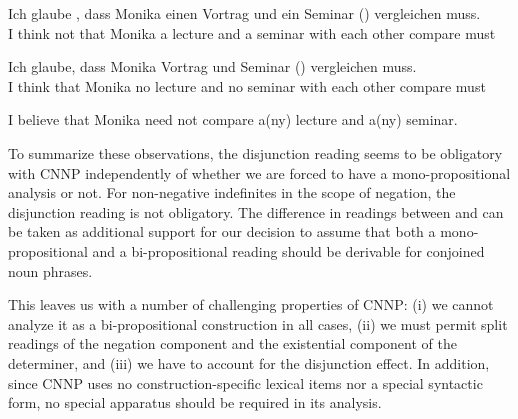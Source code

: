 \documentclass[output=paper]{langsci/langscibook}
\begin{document}
\ea \label{ex-glaub-notEX-reci}
\gll Ich glaube , dass Monika einen Vortrag und ein Seminar () vergleichen muss.\\
I think not that Monika a lecture and a seminar {with each other} compare must\\
\z 

\ea \label{ex-glaub-CNNP-reci}
\gll Ich glaube, dass Monika  Vortrag und  Seminar () vergleichen muss.\\
I think that Monika no lecture and no seminar {with each other} compare must\\
\z 

\ea \label{ex-glaub-X-reci-comp}
I believe that Monika need not compare a(ny) lecture and a(ny) seminar.
\z 





To summarize these observations, the disjunction reading seems to be obligatory with CNNP independently of whether we are forced to have a mono-pro\-po\-si\-tional analysis or not. 
For non-negative indefinites in the scope of negation, the disjunction reading is not obligatory. %
The difference in readings between  and 
can be taken as additional support for our decision to
assume that both a mono-propositional and a bi-propositional reading should be derivable for conjoined noun phrases.

\bigskip%
This leaves us with a number of challenging properties of CNNP: 
(i) we cannot analyze it as a bi-propositional construction in all cases, 
(ii) we must permit split readings of the negation component and the existential component of the determiner, 
and (iii) we have to account for the disjunction effect. In addition, since CNNP uses no construction-specific lexical items nor a special syntactic form, no special apparatus should be required in its analysis.
\end{document}
